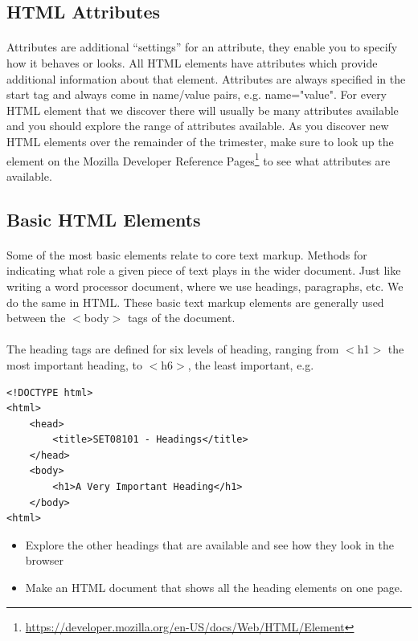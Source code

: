 \documentclass[10pt, a4paper, twosize]{article}
\begin{document}
\subsection{HTML Attributes}
\paragraph{} Attributes are additional ``settings'' for an attribute, they enable you to specify how it behaves or looks. All HTML elements have attributes which provide additional information about that element. Attributes are always specified in the start tag and always come in name/value pairs, e.g. name="value". For every HTML element that we discover there will usually be many attributes available and you should explore the range of attributes available. As you discover new HTML elements over the remainder of the trimester, make sure to look up the element on the Mozilla Developer Reference Pages\footnote{\url{https://developer.mozilla.org/en-US/docs/Web/HTML/Element}} to see what attributes are available.

\subsection{Basic HTML Elements}
\paragraph{} Some of the most basic elements relate to core text markup. Methods for indicating what role a given piece of text plays in the wider document. Just like writing a word processor document, where we use headings, paragraphs, etc. We do the same in HTML. These basic text markup elements are generally used between the $<$body$>$ tags of the document.

\paragraph{} The heading tags are defined for six levels of heading, ranging from $<$h1$>$ the most important heading, to $<$h6$>$, the least important, e.g.

\begin{lstlisting}
<!DOCTYPE html>
<html>
    <head>
        <title>SET08101 - Headings</title>
    </head>
    <body>
        <h1>A Very Important Heading</h1>      
    </body>
<html>
\end{lstlisting}

\begin{itemize}
\item Explore the other headings that are available and see how they look in the browser
\item Make an HTML document that shows all the heading elements on one page.
\end{itemize}
\end{document}

